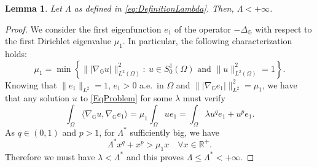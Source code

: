 \documentclass[11pt]{amsart}
\numberwithin{equation}{section} %
\newtheorem{lemma}[teo]{Lemma}
\theoremstyle{definition}
\def\R{\mathbb{R}}
\def\G{\mathbb{G}}
\newcommand{\m}{\mbox}
\begin{document}
\begin{lemma}\label{lem:LambdaInf}
	Let $\Lambda$ as defined in \eqref{eq:DefinitionLambda}. Then, $\Lambda < +\infty$.
\end{lemma}
	\begin{proof}
	We consider the first eigenfunction $e_1$ of the operator $-\Delta_\G$
	with respect to the first Dirichlet eigenvalue $\mu_1$. In particular, the following characterization holds:
	\[
	\mu_1=\min\left\{\| |\nabla_\G u|\|^2_{L^2(\Omega)}:\ u\in S^1_0(\Omega)\m{ and }\|u\|^2_{L^2(\Omega)}=1\right\}.
	\]
	Knowing that $\|e_1\|_{L^2}=1$, $e_1>0$ a.e.~in $\Omega$ and $\| |\nabla_\G e_1|\|^2_{L^2}=\mu_1$,
	we have that any solution $u$ to \eqref{EqProblem} for some $\lambda$
	must verify
	\[
	\int_\Omega \langle \nabla_\G u,\nabla_\G e_1\rangle =\mu_1 \int_\Omega u e_1=\int_\Omega \lambda u^qe_1+u^pe_1.
	\]
	As $q\in (0,1)$ and $p>1$, for $\Lambda^*$ sufficiently big, we have
	\[
	\Lambda^*x^q+x^p>\mu_1x\quad\forall x\in \R^+.
	\]
	Therefore we must have $\lambda <\Lambda^*$ and this  proves $\Lambda\leq \Lambda^*<+\infty$.
\end{proof}

\medskip

\end{document}

